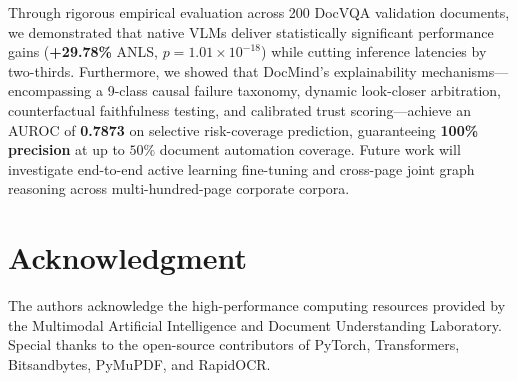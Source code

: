 \documentclass[conference]{IEEEtran}
\begin{document}
{Through rigorous empirical evaluation across 200 DocVQA validation documents, we demonstrated that native VLMs deliver statistically significant performance gains (\textbf{+29.78\%} ANLS, $p = 1.01 \times 10^{-18}$) while cutting inference latencies by two-thirds. Furthermore, we showed that DocMind's explainability mechanisms---encompassing a 9-class causal failure taxonomy, dynamic look-closer arbitration, counterfactual faithfulness testing, and calibrated trust scoring---achieve an AUROC of \textbf{0.7873} on selective risk-coverage prediction, guaranteeing \textbf{100\% precision} at up to $50\%$ document automation coverage. Future work will investigate end-to-end active learning fine-tuning and cross-page joint graph reasoning across multi-hundred-page corporate corpora.

\section*{Acknowledgment}
The authors acknowledge the high-performance computing resources provided by the Multimodal Artificial Intelligence and Document Understanding Laboratory. Special thanks to the open-source contributors of PyTorch, Transformers, Bitsandbytes, PyMuPDF, and RapidOCR.

}
\end{document}

